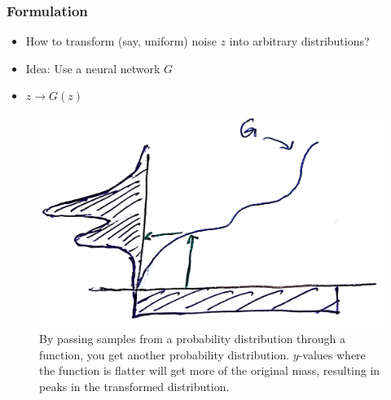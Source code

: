 \documentclass[10pt,mathserif]{beamer}
\begin{document}
\begin{frame}
  \frametitle{Formulation}
 \begin{itemize}
 \item How to transform (say, uniform) noise $z$ into arbitrary distributions?
 \item Idea: Use a neural network $G$
 \item $z \rightarrow G\left(z\right)$
 \end{itemize}
\begin{figure}[ht]
  \centering
  \includegraphics[width=0.52\paperwidth]{figure/sample_transformation}
  \caption{By passing samples from a probability distribution through a
    function, you get another probability distribution. $y$-values where the
    function is flatter will get more of the original mass, resulting in peaks
    in the transformed distribution. \label{fig:sample_transformation} }
\end{figure}
\end{frame}
\end{document}
